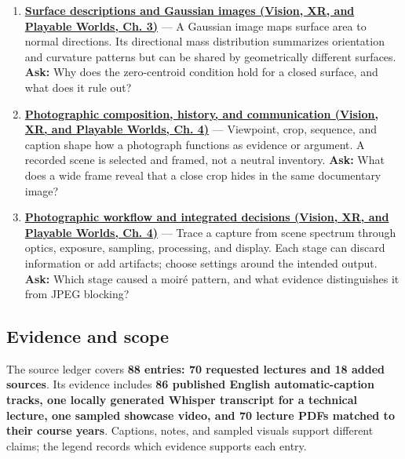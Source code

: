 \begin{enumerate}
\item
  \textbf{\href{../07-Vision-XR-and-Playable-Worlds/main.pdf\#nameddest=04-visual-computing-ii-ch032-surface-descriptions-and-gaussian-images}{Surface descriptions and Gaussian images (Vision, XR, and Playable Worlds, Ch. 3)}} --- A Gaussian image maps surface area to normal directions. Its directional mass distribution summarizes orientation and curvature patterns but can be shared by geometrically different surfaces. \textbf{Ask:} Why does the zero-centroid condition hold for a closed surface, and what does it rule out?
\item
  \textbf{\href{../07-Vision-XR-and-Playable-Worlds/main.pdf\#nameddest=04-visual-computing-ii-ch034-photographic-composition-history-and-communication}{Photographic composition, history, and communication (Vision, XR, and Playable Worlds, Ch. 4)}} --- Viewpoint, crop, sequence, and caption shape how a photograph functions as evidence or argument. A recorded scene is selected and framed, not a neutral inventory. \textbf{Ask:} What does a wide frame reveal that a close crop hides in the same documentary image?
\item
  \textbf{\href{../07-Vision-XR-and-Playable-Worlds/main.pdf\#nameddest=04-visual-computing-ii-ch034-photographic-workflow-and-integrated-decisions}{Photographic workflow and integrated decisions (Vision, XR, and Playable Worlds, Ch. 4)}} --- Trace a capture from scene spectrum through optics, exposure, sampling, processing, and display. Each stage can discard information or add artifacts; choose settings around the intended output. \textbf{Ask:} Which stage caused a moiré pattern, and what evidence distinguishes it from JPEG blocking?
\end{enumerate}

\subsection{Evidence and scope}\label{appendix-a8f634b076b5-evidence-and-scope}

\hypertarget{appendix-a8f634b076b5-evidence-and-scope}{}

The source ledger covers \textbf{88 entries: 70 requested lectures and 18 added sources}. Its evidence includes \textbf{86 published English automatic-caption tracks, one locally generated Whisper transcript for a technical lecture, one sampled showcase video, and 70 lecture PDFs matched to their course years}. Captions, notes, and sampled visuals support different claims; the legend records which evidence supports each entry.

